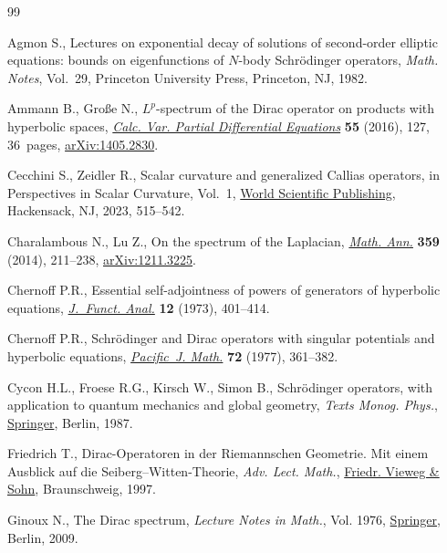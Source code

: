 \begin{thebibliography}{99}
\footnotesize\itemsep=0pt

Agmon S., Lectures on exponential decay of solutions of second-order elliptic
 equations: bounds on eigenfunctions of {$N$}-body {S}chr\"odinger operators,
 \textit{Math. Notes}, Vol.~29, Princeton University Press, Princeton, NJ,
 1982.

Ammann B., Gro{\ss}e N., {$L^p$}-spectrum of the {D}irac operator on products
 with hyperbolic spaces, \href{https://doi.org/10.1007/s00526-016-1046-z}{\textit{Calc. Var. Partial Differential Equations}}
 \textbf{55} (2016), 127, 36~pages, \href{https://arxiv.org/abs/1405.2830}{arXiv:1405.2830}.

Cecchini S., Zeidler R., Scalar curvature and generalized {C}allias operators,
 in Perspectives in {S}calar {C}urvature, Vol.~1, \href{https://doi.org/10.1142/9789811273223_0002}{World Scientific Publishing},
 Hackensack, NJ, 2023, 515--542.

Charalambous N., Lu Z., On the spectrum of the {L}aplacian, \href{https://doi.org/10.1007/s00208-013-1000-8}{\textit{Math. Ann.}}
 \textbf{359} (2014), 211--238, \href{https://arxiv.org/abs/1211.3225}{arXiv:1211.3225}.

Chernoff P.R., Essential self-adjointness of powers of generators of hyperbolic
 equations, \href{https://doi.org/10.1016/0022-1236(73)90003-7}{\textit{J.~Funct. Anal.}} \textbf{12} (1973), 401--414.

Chernoff P.R., Schr\"odinger and {D}irac operators with singular potentials and
 hyperbolic equations, \href{https://doi.org/10.2140/pjm.1977.72.361}{\textit{Pacific~J. Math.}} \textbf{72} (1977), 361--382.

Cycon H.L., Froese R.G., Kirsch W., Simon B., Schr\"odinger operators, with
 application to quantum mechanics and global geometry, \textit{Texts Monog. Phys.},
 \href{https://doi.org/10.1007/978-3-540-77522-5}{Springer}, Berlin, 1987.

Friedrich T., Dirac-{O}peratoren in der {R}iemannschen {G}eometrie. {M}it einem
 {A}usblick auf die {S}eiberg--{W}itten-{T}heorie, \textit{Adv. Lect. Math.}, \href{https://doi.org/10.1007/978-3-322-80302-3}{Friedr.
 Vieweg \& Sohn}, Braunschweig, 1997.

Ginoux N., The {D}irac spectrum, \textit{Lecture Notes in Math.}, Vol. 1976,
 \href{https://doi.org/10.1007/978-3-642-01570-0}{Springer}, Berlin, 2009.


\end{thebibliography}
